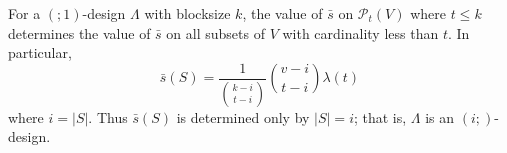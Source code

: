 For a $(; 1)$-design $\Lambda$ with blocksize $k$, the value of $\bar{s}$ on $\mathcal{P}_t(V)$ where $t \leq k$ determines the value of $\bar{s}$ on all subsets of $V$ with cardinality less than $t$. In particular,
$$\bar{s}(S) = \frac{1}{\binom{k-i}{t-i}} \binom{v-i}{t-i} \lambda(t)$$
where $i = |S|$. Thus $\bar{s}(S)$ is determined only by $|S| = i$; that is, $\Lambda$ is an $(i;)$-design.
